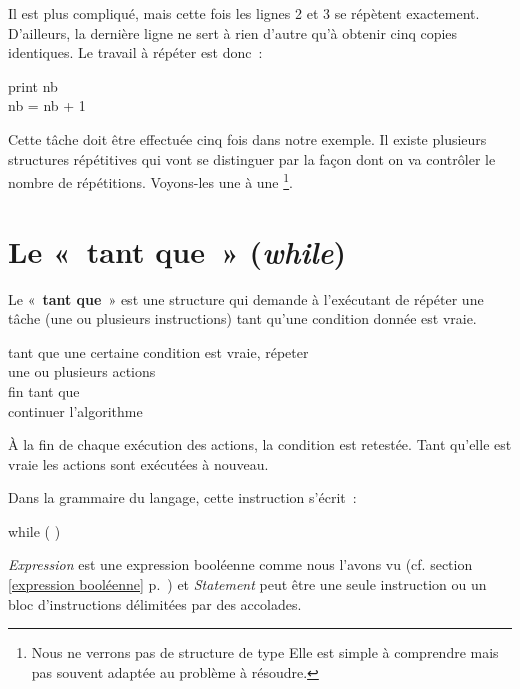 		Il est plus compliqué, mais cette fois les lignes 2 et 3 se répètent
		exactement.  D’ailleurs, la dernière ligne ne sert à rien d’autre qu’à
		obtenir cinq copies identiques.  Le travail à répéter est donc~:

		\begin{langagenaturel}
			print nb\\
			nb = nb + 1
		\end{langagenaturel}

		Cette tâche doit être effectuée cinq fois dans notre exemple.
		Il existe plusieurs structures répétitives
		qui vont se distinguer par la façon dont on va
		contrôler le nombre de répétitions.
		Voyons-les une à une%
		\footnote{%
			Nous ne verrons pas de structure de type
			Elle est simple à comprendre
			mais pas souvent adaptée au problème à résoudre.
		}.

\clearpage
\section{Le «~tant que~» (\textit{while})}
	
	Le «~\textbf{tant que}~» est une structure qui demande à l’exécutant de
	répéter une tâche (une ou plusieurs instructions) tant qu’une condition
	donnée est vraie.
	
	\begin{langagenaturel}
		tant que une certaine condition est vraie, répeter\\
			\tab une ou plusieurs actions\\
		fin tant que\\
		continuer l'algorithme 
	\end{langagenaturel}

	À la fin de chaque exécution des actions, la condition est retestée. Tant
	qu'elle est vraie les actions sont exécutées à nouveau. 

	Dans la grammaire du langage, cette instruction s'écrit~:
	
	\begin{grammaire}
		    while (  )
	\end{grammaire}
	
	\textit{Expression} est une expression booléenne comme nous l'avons vu (cf.
	section \ref{expression booléenne} p.~\pageref{expression booléenne}) et
	\textit{Statement} peut être une seule instruction ou un bloc
	d'instructions délimitées par des accolades.
	
